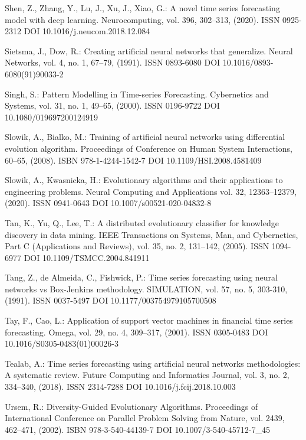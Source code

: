 \begin{thebibliography}{99.}
 Shen, Z., Zhang, Y., Lu, J., Xu, J., Xiao, G.: A novel time series forecasting model with deep learning. Neurocomputing, vol. 396, 302--313, (2020). ISSN 0925-2312 DOI 10.1016/j.neucom.2018.12.084

 Sietsma, J., Dow, R.: Creating artificial neural networks that generalize. Neural Networks, vol. 4, no. 1, 67--79, (1991). ISSN 0893-6080 DOI 10.1016/0893-6080(91)90033-2

 Singh, S.: Pattern Modelling in Time-series Forecasting. Cybernetics and Systems, vol. 31, no. 1, 49--65, (2000). ISSN 0196-9722 DOI 10.1080/019697200124919

 Slowik, A., Bialko, M.: Training of artificial neural networks using differential evolution algorithm. Proceedings of Conference on Human System Interactions, 60--65, (2008). ISBN 978-1-4244-1542-7 DOI 10.1109/HSI.2008.4581409

 Slowik, A., Kwasnicka, H.: Evolutionary algorithms and their applications to engineering problems. Neural Computing and Applications vol. 32, 12363--12379, (2020). ISSN 0941-0643 DOI 10.1007/s00521-020-04832-8

 Tan, K., Yu, Q., Lee, T.: A distributed evolutionary classifier for knowledge discovery in data mining. IEEE Transactions on Systems, Man, and Cybernetics, Part C (Applications and Reviews), vol. 35, no. 2, 131--142, (2005). ISSN 1094-6977 DOI 10.1109/TSMCC.2004.841911

 Tang, Z., de Almeida, C., Fishwick, P.: Time series forecasting using neural networks vs Box-Jenkins methodology. SIMULATION, vol. 57, no. 5, 303-310, (1991). ISSN 0037-5497 DOI 10.1177/003754979105700508

 Tay, F., Cao, L.: Application of support vector machines in financial time series forecasting. Omega, vol. 29, no. 4, 309--317, (2001). ISSN 0305-0483 DOI 10.1016/S0305-0483(01)00026-3

 Tealab, A.: Time series forecasting using artificial neural networks methodologies: A systematic review. Future Computing and Informatics Journal, vol. 3, no. 2, 334--340, (2018). ISSN 2314-7288 DOI 10.1016/j.fcij.2018.10.003

 Ursem, R.: Diversity-Guided Evolutionary Algorithms. Proceedings of International Conference on Parallel Problem Solving from Nature, vol. 2439, 462--471, (2002). ISBN 978-3-540-44139-7 DOI 10.1007/3-540-45712-7\_45


\end{thebibliography}
